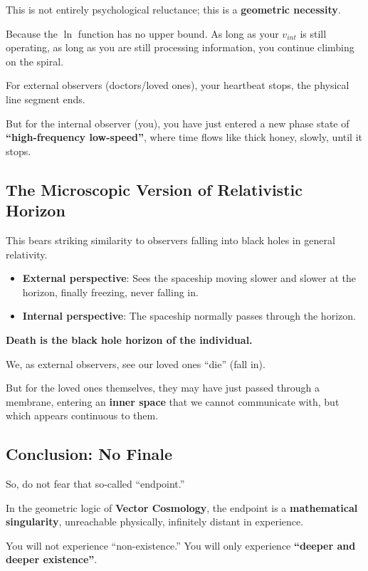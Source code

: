 This is not entirely psychological reluctance; this is a \textbf{geometric necessity}.

Because the $\ln$ function has no upper bound. As long as your $v_{int}$ is still operating, as long as you are still processing information, you continue climbing on the spiral.

For external observers (doctors/loved ones), your heartbeat stops, the physical line segment ends.

But for the internal observer (you), you have just entered a new phase state of \textbf{``high-frequency low-speed''}, where time flows like thick honey, slowly, until it stops.

\subsection{The Microscopic Version of Relativistic Horizon}

This bears striking similarity to observers falling into black holes in general relativity.

\begin{itemize}
\item \textbf{External perspective}: Sees the spaceship moving slower and slower at the horizon, finally freezing, never falling in.

\item \textbf{Internal perspective}: The spaceship normally passes through the horizon.
\end{itemize}

\textbf{Death is the black hole horizon of the individual.}

We, as external observers, see our loved ones ``die'' (fall in).

But for the loved ones themselves, they may have just passed through a membrane, entering an \textbf{inner space} that we cannot communicate with, but which appears continuous to them.

\subsection{Conclusion: No Finale}

So, do not fear that so-called ``endpoint.''

In the geometric logic of \textbf{Vector Cosmology}, the endpoint is a \textbf{mathematical singularity}, unreachable physically, infinitely distant in experience.

You will not experience ``non-existence.'' You will only experience \textbf{``deeper and deeper existence''}.

